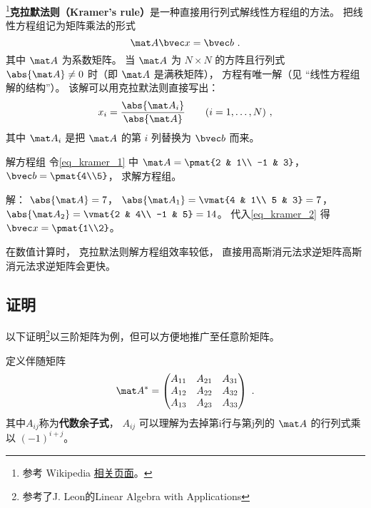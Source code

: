 
\begin{issues}
\issueTODO
\end{issues}


\footnote{参考 Wikipedia \href{https://en.wikipedia.org/wiki/Cramer's_rule}{相关页面}。}\textbf{克拉默法则（Kramer's rule）}是一种直接用行列式解线性方程组的方法。 把线性方程组记为矩阵乘法的形式
\begin{equation}\label{eq_kramer_1}
\mat A \bvec x = \bvec b~.
\end{equation}
其中 $\mat A$ 为系数矩阵。 当 $\mat A$ 为 $N\times N$ 的方阵且行列式 $\abs{\mat A} \ne 0$ 时（即 $\mat A$ 是满秩矩阵）， 方程有唯一解（见 “线性方程组解的结构”）。 该解可以用克拉默法则直接写出：
\begin{equation}\label{eq_kramer_2}
x_i = \frac{\abs{\mat A_i}}{\abs{\mat A}} \qquad (i = 1, \dots, N)~,
\end{equation}
其中 $\mat A_i$ 是把 $\mat A$ 的第 $i$ 列替换为 $\bvec b$ 而来。

\begin{example}{解方程组}
令\autoref{eq_kramer_1} 中 $\mat A = \pmat{2 & 1\\ -1 & 3}$， $\bvec b = \pmat{4\\5}$， 求解方程组。

解： $\abs{\mat A} = 7$， $\abs{\mat A_1} = \vmat{4 & 1\\ 5 & 3} = 7$， $\abs{\mat A_2} = \vmat{2 & 4\\ -1 & 5} = 14$。 代入\autoref{eq_kramer_2} 得 $\bvec x = \pmat{1\\2}$。
\end{example}

在数值计算时， 克拉默法则解方程组效率较低， 直接用高斯消元法求逆矩阵高斯消元法求逆矩阵会更快。

\subsection{证明}

以下证明\footnote{参考了J. Leon的Linear Algebra with Applications}以三阶矩阵为例，但可以方便地推广至任意阶矩阵。

定义伴随矩阵
\begin{equation}
\mat A^*=
\begin{pmatrix}
A_{11}&A_{21}&A_{31}\\
A_{12}&A_{22}&A_{32}\\
A_{13}&A_{23}&A_{33}\\
\end{pmatrix}~.
\end{equation}
其中$A_{ij}$称为\textbf{代数余子式}， $A_{ij}$ 可以理解为去掉第i行与第j列的 $\mat A$ 的行列式乘以 $(-1)^{i+j}$。

